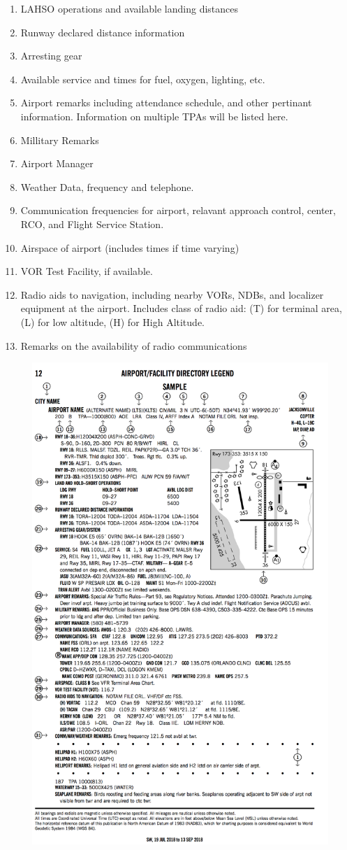 \documentclass[12pt]{article}
\begin{document}
\begin{multicols}{2}
\begin{enumerate}
					\item LAHSO operations and available landing distances
					\item Runway declared distance information
					\item Arresting gear
					\item Available service and times for fuel, oxygen, lighting, etc.
					\item Airport remarks including attendance schedule, and other pertinant information. Information on multiple TPAs will be listed here.
					\item  Millitary Remarks
					\item Airport Manager
					\item Weather Data, frequency and telephone.
					\item Communication frequencies for airport, relavant approach control, center, RCO, and Flight Service Station.
					\item Airspace of airport (includes times if time varying)
					\item VOR Test Facility, if available.
					\item Radio aids to navigation, including nearby VORs, NDBs, and localizer equipment at the airport. Includes class of radio aid: (T) for terminal area, (L) for low altitude, (H) for High Altitude.
					\item Remarks on the availability of radio communications
				\end{enumerate}
				\end{multicols}
				\endgroup
				\begin{figure}
					\centering
					\includegraphics[width=0.55\linewidth]{Figures/AFD Legend.png}
				\end{figure}
				\newpage
\end{document}
